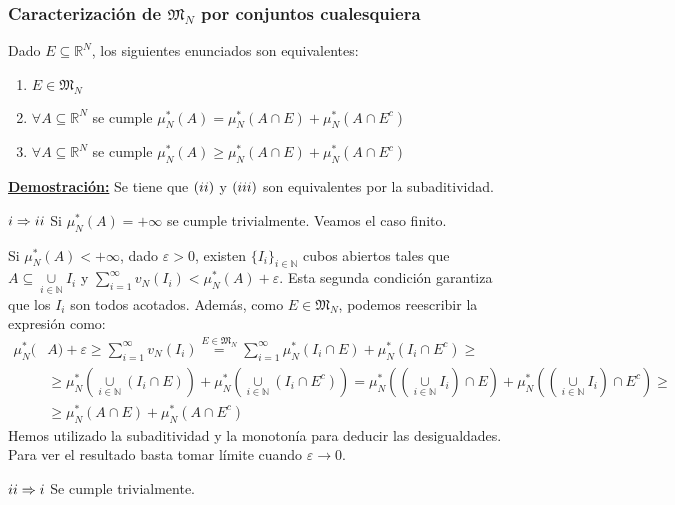 \documentclass[12pt,a4paper]{article}
\newcommand{\R}{\mathbb{R}}
\newcommand{\N}{\mathbb{N}}
\newcommand{\smallcup}{\mathop{\cup}\limits}
\newcommand{\smallsum}{\mathop{\sum}\limits}
\newcounter{unit}[section]
\newcounter{chapter}[unit]
\renewcommand{\theunit}{\arabic{unit}}
\renewcommand{\thechapter}{\arabic{chapter}}
\renewcommand{\thesubsubsection}{\theunit.\thechapter.\arabic{subsubsection}}
\newcommand{\result}[1]{%
  \subsubsection{#1}%
  \label{result:\thesubsubsection}
}
\newcommand{\dem}{
    \noindent \underline{\textbf{Demostración:}}
}
\begin{document}
\vspace{6mm}
\result{Caracterización de \texorpdfstring{$\mathfrak{M}_N$}{M\_n} por conjuntos cualesquiera}
\hspace{3mm} Dado $E \subseteq \R^N$, los siguientes enunciados son equivalentes:
\begin{enumerate}[label=\roman*)]
    \item $E \in \mathfrak{M}_N$
    \item $\forall A \subseteq \R^N$ se cumple $\mu^*_N(A) = \mu^*_N(A \cap E) + \mu^*_N(A \cap E^c)$
    \item $\forall A \subseteq \R^N$ se cumple $\mu^*_N(A) \geq \mu^*_N(A \cap E)+ \mu^*_N(A \cap E^c)$
\end{enumerate}
\vspace{2mm}
\dem Se tiene que $(\romannumeral 2)$ y $(\romannumeral 3)$ son equivalentes por la subaditividad.

\begin{tcolorbox}
    $\romannumeral 1 \Rightarrow \romannumeral 2$ \hspace{3mm}
    Si $\mu^*_N(A) = +\infty$ se cumple trivialmente. Veamos el caso finito.
\end{tcolorbox}
Si $\mu^*_N(A)<+\infty$, dado $\varepsilon > 0$, existen $\{I_i\}_{i \in \N}$ cubos abiertos tales que $A \subseteq \smallcup_{i\in\N}I_i$ y $\smallsum_{i=1}^{\infty}v_N(I_i) < \mu^*_N(A) + \varepsilon$.
Esta segunda condición garantiza que los $I_i$ son todos acotados. Además, como $E \in \mathfrak{M}_N$, podemos reescribir la expresión como:
\\[-3ex]
\begin{align*}
    \mu^*_N(&A) + \varepsilon \geq \sum_{i=1}^{\infty}v_N(I_i) \overset{E \in \mathfrak{M}_N}{=} \sum_{i=1}^{\infty}\mu^*_N(I_i \cap E) + \mu^*_N(I_i \cap E^c) \geq\\
    &\geq \mu^*_N\left(\smallcup_{i\in\N}(I_i \cap E)\right) + \mu^*_N\left(\smallcup_{i\in\N}(I_i \cap E^c)\right) = \mu^*_N\left((\smallcup_{i\in\N} I_i) \cap E\right) + \mu^*_N\left((\smallcup_{i\in\N}I_i) \cap E^c\right) \geq \\
    &\geq \mu^*_N(A \cap E) + \mu^*_N(A \cap E^c)
\end{align*}
Hemos utilizado la subaditividad y la monotonía para deducir las desigualdades. Para ver el resultado basta tomar límite cuando $\varepsilon \to 0$.

\vspace{4mm}
\begin{tcolorbox}
    $\romannumeral 2 \Rightarrow \romannumeral 1$ \hspace{3mm} Se cumple trivialmente.
\end{tcolorbox}
\end{document}
